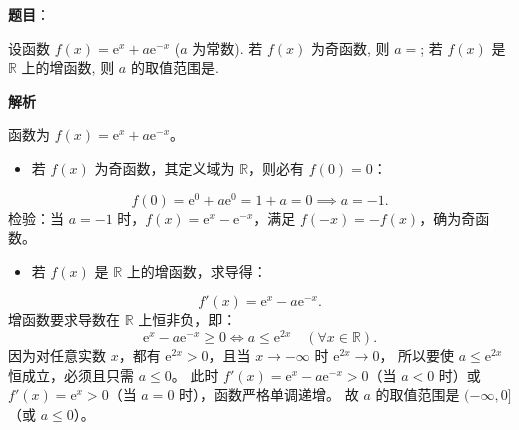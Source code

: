 \begin{answer}

\textbf{题目}：

设函数 $f(x) = \mathrm{e}^x + a\mathrm{e}^{-x}$ ($a$ 为常数). 若 $f(x)$ 为奇函数, 则 $a =$\gkblank{}; 若 $f(x)$ 是 $\mathbb{R}$ 上的增函数, 则 $a$ 的取值范围是\gkblank{}.

\textbf{解析}

函数为 $f(x) = \mathrm{e}^x + a\mathrm{e}^{-x}$。
\begin{itemize}
\item 若 $f(x)$ 为奇函数，其定义域为 $\mathbb{R}$，则必有 $f(0) = 0$：
\end{itemize}
\nopagebreak[4]
\[f(0) = \mathrm{e}^0 + a\mathrm{e}^0 = 1 + a = 0 \implies a = -1.\]
  检验：当 $a = -1$ 时，$f(x) = \mathrm{e}^x - \mathrm{e}^{-x}$，满足 $f(-x) = -f(x)$，确为奇函数。
\begin{itemize}
\item 若 $f(x)$ 是 $\mathbb{R}$ 上的增函数，求导得：
\end{itemize}
\nopagebreak[4]
\[f'(x) = \mathrm{e}^x - a\mathrm{e}^{-x}.\]
  增函数要求导数在 $\mathbb{R}$ 上恒非负，即：
\nopagebreak[4]
\[\mathrm{e}^x - a\mathrm{e}^{-x} \geqslant 0 \iff a \leqslant \mathrm{e}^{2x} \quad (\forall x \in \mathbb{R}).\]
  因为对任意实数 $x$，都有 $\mathrm{e}^{2x} > 0$，且当 $x \to -\infty$ 时 $\mathrm{e}^{2x} \to 0$，
  所以要使 $a \leqslant \mathrm{e}^{2x}$ 恒成立，必须且只需 $a \leqslant 0$。
  此时 $f'(x) = \mathrm{e}^x - a\mathrm{e}^{-x} > 0$（当 $a < 0$ 时）或 $f'(x) = \mathrm{e}^x > 0$（当 $a = 0$ 时），函数严格单调递增。
  故 $a$ 的取值范围是 $(-\infty, 0]$（或 $a \leqslant 0$）。

\gkanswer{答案：$-1$；$(-\infty, 0]$（或 $a \leqslant 0$）}

\end{answer}

